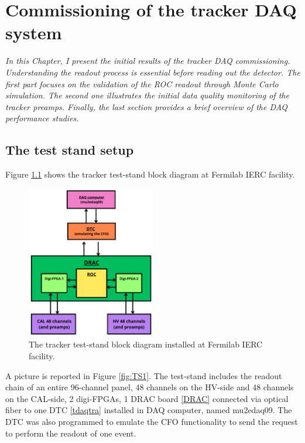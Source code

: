 \chapter{Commissioning of the tracker DAQ system}
\textit{In this Chapter, I present the initial results of the tracker DAQ commissioning. 
Understanding the readout process is essential before reading out the detector. 
The first part focuses on the validation of the ROC readout through Monte Carlo simulation. 
The second one illustrates the initial data quality monitoring of the tracker preamps. 
Finally, the last section provides a brief overview of the DAQ performance studies.
}

  \section{The test stand setup}\label{des}
  Figure \ref{fig:blockdiagram} shows the tracker 
  test-stand block diagram at Fermilab IERC facility.
  
  \begin{figure}[!h]
    \centering
    \includegraphics[width =0.5\textwidth]{figures/png/Screenshot_20240712_102528.png}
    \caption{The tracker test-stand block diagram installed at Fermilab IERC facility.}
    \label{fig:blockdiagram}
    \end{figure}



  A picture is reported in Figure \ref{fig:TS1}.
  The test-stand includes the readout chain of an entire 96-channel panel, 
  48 channels on the HV-side and 48 channels on the CAL-side, 2 digi-FPGAs, 
  1 DRAC board \ref{DRAC} connected via optical fiber to one DTC 
  \ref{tdaqtra} installed in DAQ computer, named mu2edaq09. 
  The DTC was also programmed to emulate the CFO functionality to send 
  the request to perform the readout of one event.
    
